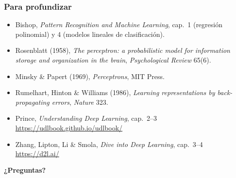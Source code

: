 \documentclass[aspectratio=169, 10pt]{beamer}
\begin{document}
\begin{frame}
\frametitle{Para profundizar}
\begin{itemize}
	\item Bishop, \emph{Pattern Recognition and Machine Learning}, cap.~1 (regresi\'on polinomial) y 4 (modelos lineales de clasificaci\'on).
	\item Rosenblatt (1958), \emph{The perceptron: a probabilistic model for information storage and organization in the brain}, \emph{Psychological Review} 65(6).
	\item Minsky \& Papert (1969), \emph{Perceptrons}, MIT Press.
	\item Rumelhart, Hinton \& Williams (1986), \emph{Learning representations by back-propagating errors}, \emph{Nature} 323.
	\item Prince, \emph{Understanding Deep Learning}, cap.~2--3\\ \url{https://udlbook.github.io/udlbook/}
	\item Zhang, Lipton, Li \& Smola, \emph{Dive into Deep Learning}, cap.~3--4\\ \url{https://d2l.ai/}
\end{itemize}
\vspace{0.5em}
\begin{center}
\Large \textbf{¿Preguntas?}
\end{center}
\end{frame}
\end{document}
